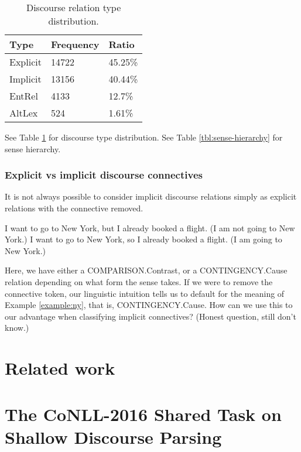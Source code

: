 \begin{table}[t]
\centering
\begin{tabular}{@{}lll@{}}
\toprule
Type     & Frequency & Ratio \\ \midrule
Explicit & 14722 & 45.25\%    \\
Implicit & 13156 & 40.44\%    \\
EntRel   & 4133  & 12.7\%     \\
AltLex   & 524   & 1.61\%     \\ \bottomrule
\end{tabular}
\caption{Discourse relation type distribution.}
\label{tbl:discourse-relation-type-distribution}
\end{table}
See Table \ref{tbl:discourse-relation-type-distribution} for discourse type distribution. See Table \ref{tbl:sense-hierarchy} for sense hierarchy.

\subsubsection{Explicit vs implicit discourse connectives} \label{sec:implexpl}



It is not always possible to consider implicit discourse relations simply as explicit relations with the connective removed.

\begin{exe}
\ex I want to go to New York, but I already booked a flight. (I am not going to New York.)\label{example:notny}
\ex I want to go to New York, so I already booked a flight. (I am going to New York.)\label{example:ny}
\end{exe}

Here, we have either a COMPARISON.Contrast, or a CONTINGENCY.Cause relation depending on what form the sense takes. If we were to remove the connective token, our linguistic intuition tells us to default for the meaning of Example \ref{example:ny}, that is, CONTINGENCY.Cause. How can we use this to our advantage when classifying implicit connectives? (Honest question, still don't know.)

\section{Related work}


\section{The CoNLL-2016 Shared Task on Shallow Discourse Parsing}

